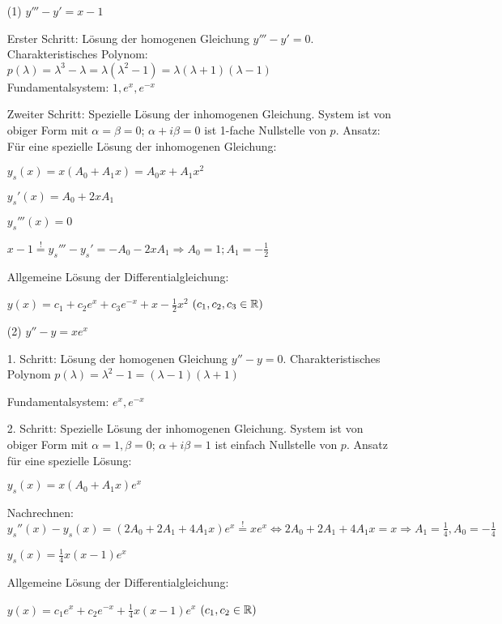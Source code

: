 \documentclass[a4paper,twoside,DIV15,BCOR12mm]{scrbook}
\begin{document}
\begin{beispiel}
\begin{itemize}
	\item[(1)] $y''' - y' = x-1$
	
	Erster Schritt: Lösung der homogenen Gleichung $y''' - y' = 0$. Charakteristisches Polynom: $p(\lambda) = \lambda^3-\lambda = \lambda(\lambda^2 - 1) = \lambda( \lambda + 1)(\lambda - 1)$ \\	
	Fundamentalsystem: $1, e^x, e^{-x}$
	
	Zweiter Schritt: Spezielle Lösung der inhomogenen Gleichung. System ist von obiger Form mit $\alpha= \beta = 0$; $\alpha + i \beta = 0$ ist 1-fache Nullstelle von $p$. Ansatz: Für eine spezielle Lösung der inhomogenen Gleichung:
	
	$y_s(x) = x ( A_0 + A_1 x) = A_0x + A_1 x^2$
	
	$y_s'(x) = A_0 + 2x A_1$
	
	$y_s'''(x) = 0$
	
	$x-1 \stackrel{!}{=}y_s''' - y_s' = -A_0 - 2xA_1 \Rightarrow A_0 = 1; A_1 = -\frac{1}{2}$
	
	Allgemeine Lösung der Differentialgleichung:
	
	$y(x) = c_1 + c_2e^x + c_3e^{-x} + x - \frac{1}{2}x^2$ $(c_1, c_2, c_3 \in \mathbb{R})$
	
	\item[(2)] $y'' - y = x e^x$
	
	1. Schritt: Lösung der homogenen Gleichung $y'' - y = 0$. Charakteristisches Polynom $p(\lambda) = \lambda^2 - 1 = (\lambda - 1)(\lambda + 1)$
	
	Fundamentalsystem: $e^x, e^{-x}$
	
	2. Schritt: Spezielle Lösung der inhomogenen Gleichung. System ist von obiger Form mit $\alpha = 1, \beta = 0$; $\alpha + i \beta = 1$ ist einfach Nullstelle von $p$. Ansatz für eine spezielle Lösung:
	
	$y_s(x) = x(A_0 + A_1 x) e^x$
	
	Nachrechnen: $y_s''(x) - y_s(x) = (2 A_0 + 2 A_1 + 4 A_1 x) e^x \stackrel{!}{=} xe^x \Leftrightarrow 2 A_0 + 2 A_1 + 4 A_1 x = x \Rightarrow A_1 = \frac{1}{4}, A_0 = - \frac{1}{4}$
	
	$y_s(x) = \frac{1}{4} x ( x-1) e^x$
	
	Allgemeine Lösung der Differentialgleichung:
	
	$y(x) = c_1 e^x + c_2 e^{-x} + \frac{1}{4}x(x-1)e^x$ $(c_1,c_2 \in \mathbb{R})$
	
\end{itemize}
\end{beispiel}
	
\end{document}
